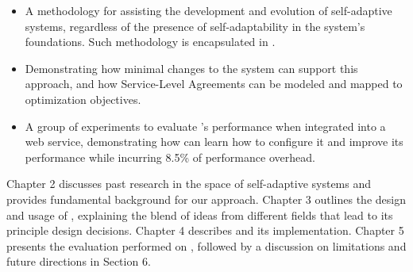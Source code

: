 \begin{itemize}
  \item A methodology for assisting the development and evolution of self-adaptive systems, regardless of the presence of self-adaptability in the system's foundations. Such methodology is encapsulated in \projectname{}.
  \item Demonstrating how minimal changes to the system can support this approach, and how Service-Level Agreements can be modeled and mapped to optimization objectives.
  \item A group of experiments to evaluate \projectname{}'s performance when integrated into a web service, demonstrating how \projectname{} can learn how to configure it and improve its performance while incurring 8.5\% of performance overhead.
\end{itemize}

Chapter 2 discusses past research in the space of self-adaptive systems and provides fundamental background for our approach. Chapter 3 outlines the design and usage of \projectname{}, explaining the blend of ideas from different fields that lead to its principle design decisions. Chapter 4 describes \projectname{} and its implementation. Chapter 5 presents the evaluation performed on \projectname{}, followed by a discussion on limitations and future directions in Section 6.

%



